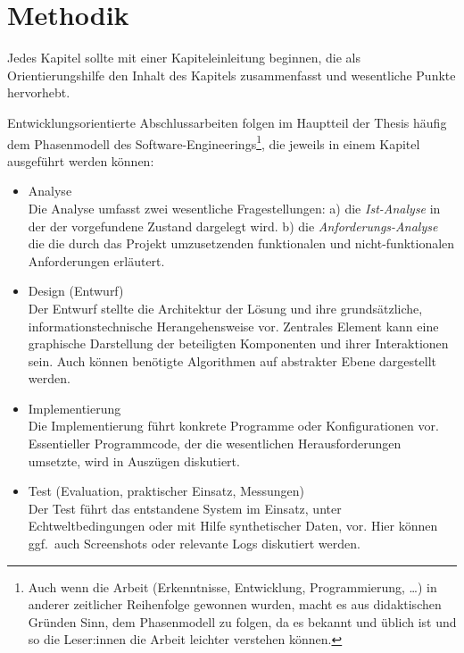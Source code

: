 \chapter{Methodik}

Jedes Kapitel sollte mit einer Kapiteleinleitung beginnen, die als Orientierungshilfe den Inhalt des Kapitels zusammenfasst und wesentliche Punkte hervorhebt.

Entwicklungsorientierte Abschlussarbeiten folgen im Hauptteil der Thesis häufig dem Phasenmodell des Software-Engineerings\footnote{Auch wenn die Arbeit (Erkenntnisse, Entwicklung, Programmierung, \ldots) in anderer
zeitlicher Reihenfolge gewonnen wurden, macht es aus didaktischen Gründen Sinn, dem Phasenmodell zu folgen, da es bekannt und üblich ist und so die Leser:innen die Arbeit leichter verstehen können.}, die jeweils in einem Kapitel ausgeführt werden können:
\begin{itemize}\setlength{\parskip}{1ex}

\item Analyse\\
Die Analyse umfasst zwei wesentliche Fragestellungen: a) die \emph{Ist-Analyse} in der der vorgefundene Zustand dargelegt wird. b) die \emph{Anforderungs-Analyse} die die durch das Projekt umzusetzenden 
funktionalen und nicht-funktionalen Anforderungen erläutert.

\item Design (Entwurf)\\
Der Entwurf stellte die Architektur der Lösung und ihre grundsätzliche, informationstechnische Herangehensweise vor. 
Zentrales Element kann eine graphische Darstellung der beteiligten Komponenten und ihrer Interaktionen sein. Auch können benötigte Algorithmen auf abstrakter Ebene dargestellt werden.

\item Implementierung\\
Die Implementierung führt konkrete Programme oder Konfigurationen vor. Essentieller Programmcode, der die wesentlichen Herausforderungen umsetzte, wird in Auszügen diskutiert.

\item Test (Evaluation, praktischer Einsatz, Messungen)\\
Der Test führt das entstandene System im Einsatz, unter Echtweltbedingungen oder mit Hilfe synthetischer Daten, vor. Hier können ggf.\ auch Screenshots oder relevante Logs diskutiert werden.
\end{itemize}


